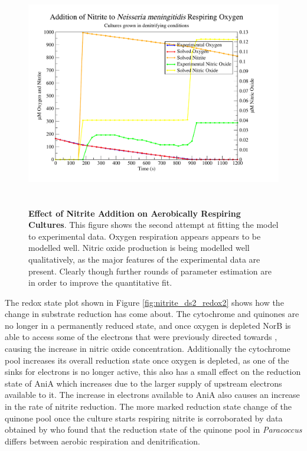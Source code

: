 \begin{figure}[tbp]
 \centering
 \includegraphics[height=10cm, trim=1cm 1cm 3cm 1cm, clip=true]{./07-nitritereduction/data/dataset2-2.pdf}
 \caption[Effect of Nitrite Addition on Aerobically Respiring Cultures]{{\bf Effect of Nitrite Addition on Aerobically Respiring Cultures}. This figure shows the second attempt at fitting the model to experimental data. Oxygen respiration appears appears to be modelled well. Nitric oxide production is being modelled well qualitatively, as the major features of the experimental data are present. Clearly though further rounds of parameter estimation are in order to improve the quantitative fit.
  \label{fig:nitrite_ds2_solved2}}
\end{figure}

The redox state plot shown in Figure \ref{fig:nitrite_ds2_redox2} shows how the change in substrate reduction has come about. The cytochrome and quinones are no longer in a permanently reduced state, and once oxygen is depleted NorB is able to access some of the electrons that were previously directed towards \cbbthree{}, causing the increase in nitric oxide concentration. Additionally the cytochrome pool increases its overall reduction state once oxygen is depleted, as one of the sinks for electrons is no longer active, this also has a small effect on the reduction state of AniA which increases due to the larger supply of upstream electrons available to it. The increase in electrons available to AniA also causes an increase in the rate of nitrite reduction. The more marked reduction state change of the quinone pool once the culture starts respiring nitrite is corroborated by data obtained by \citet{Otten1999} who found that the reduction state of the quinone pool in \textit{Paracoccus} differs between aerobic respiration and denitrification.

